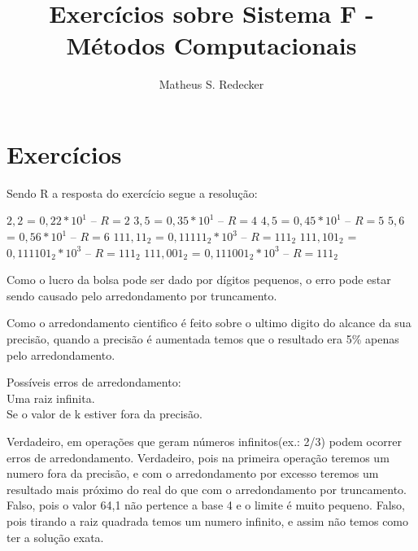 \documentclass[12pt]{article}
\title{Exercícios sobre Sistema F - Métodos Computacionais}
\author{Matheus S. Redecker\inst{1}}
\begin{document}
 

\maketitle


\section{Exercícios}

Sendo R a resposta do exercício segue a resolução:

     $2,2$ = $0,22 * 10^{1}$ -- $R = 2$
     $3,5$ = $0,35 * 10^{1}$ -- $R = 4$
     $4,5$ = $0,45 * 10^{1}$ -- $R = 5$
     $5,6$ = $0,56 * 10^{1}$ -- $R = 6$
     $111,11_{2}$ = $0,11111_{2} * 10^{3}$ -- $R = 111_{2}$
     $111,101_{2}$ = $0,111101_{2} * 10^{3}$ -- $R = 111_{2}$
     $111,001_{2}$ = $0,111001_{2} * 10^{3}$ -- $R = 111_{2}$ 

 Como o lucro da bolsa pode ser dado por dígitos pequenos, o erro pode estar sendo causado pelo arredondamento por truncamento.

 Como o arredondamento cientifico é feito sobre o ultimo digito do alcance da sua precisão, quando a precisão é aumentada temos que o resultado era 5\% apenas pelo arredondamento.

 Possíveis erros de arredondamento: \\
Uma raiz infinita.\\
Se o valor de k estiver fora da precisão.

     Verdadeiro, em operações que geram números infinitos(ex.: 2/3) podem ocorrer erros de arredondamento.
     Verdadeiro, pois na primeira operação teremos um numero fora da precisão, e com o arredondamento por excesso teremos um resultado mais próximo do real do que com o arredondamento por truncamento.
     Falso, pois o valor 64,1 não pertence a base 4 e o limite é muito pequeno.
     Falso, pois tirando a raiz quadrada temos um numero infinito, e assim não temos como ter a solução exata.
\end{document}
